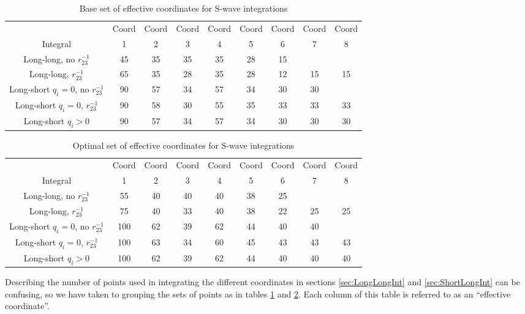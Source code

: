 \documentclass[Dissertation.tex]{subfiles}
\begin{document}
\begin{table}[H]
\centering
\begin{tabular}{|c|c|c|c|c|c|c|c|c|}
\hline
 & Coord & Coord & Coord & Coord & Coord & Coord & Coord & Coord\\
Integral & 1 & 2 & 3 & 4 & 5 & 6 & 7 & 8 \\
\hline
 Long-long, no $r_{23}^{-1}$ & 45 & 35 & 35 & 35 & 28 & 15 & & \\
 Long-long, $r_{23}^{-1}$ & 65 & 35 & 28 & 35 & 28 & 12 & 15 & 15 \\
\hline
 Long-short $q_i = 0$, no $r_{23}^{-1}$ & 90 & 57 & 34 & 57 & 34 & 30 & 30 & \\
 Long-short $q_i = 0$, $r_{23}^{-1}$ & 90 & 58 & 30 & 55 & 35 & 33 & 33 & 33 \\
 Long-short $q_i > 0$ & 90 & 57 & 34 & 57 & 34 & 30 & 30 & 30 \\
\hline
\end{tabular}
\caption{Base set of effective coordinates for S-wave integrations}
\label{tab:BaseEffectiveCoords}
\end{table}


\begin{table}[H]
\centering
\begin{tabular}{|c|c|c|c|c|c|c|c|c|}
\hline
 & Coord & Coord & Coord & Coord & Coord & Coord & Coord & Coord\\
Integral & 1 & 2 & 3 & 4 & 5 & 6 & 7 & 8 \\
\hline
 Long-long, no $r_{23}^{-1}$ & 55 & 40 & 40 & 40 & 38 & 25 & & \\
 Long-long, $r_{23}^{-1}$ & 75 & 40 & 33 & 40 & 38 & 22 & 25 & 25 \\
\hline
 Long-short $q_i = 0$, no $r_{23}^{-1}$ & 100 & 62 & 39 & 62 & 44 & 40 & 40 & \\
 Long-short $q_i = 0$, $r_{23}^{-1}$ & 100 & 63 & 34 & 60 & 45 & 43 & 43 & 43 \\
 Long-short $q_i > 0$ & 100 & 62 & 39 & 62 & 44 & 40 & 40 & 40 \\
\hline
\end{tabular}
\caption{Optimal set of effective coordinates for S-wave integrations}
\label{tab:OptimalEffectiveCoords}
\end{table}

Describing the number of points used in integrating the different coordinates in sections \ref{sec:LongLongInt} and \ref{sec:ShortLongInt} can be confusing, so we have taken to grouping the sets of points as in tables \ref{tab:BaseEffectiveCoords} and \ref{tab:OptimalEffectiveCoords}. Each column of this table is referred to as an ``effective coordinate''.
\end{document}
